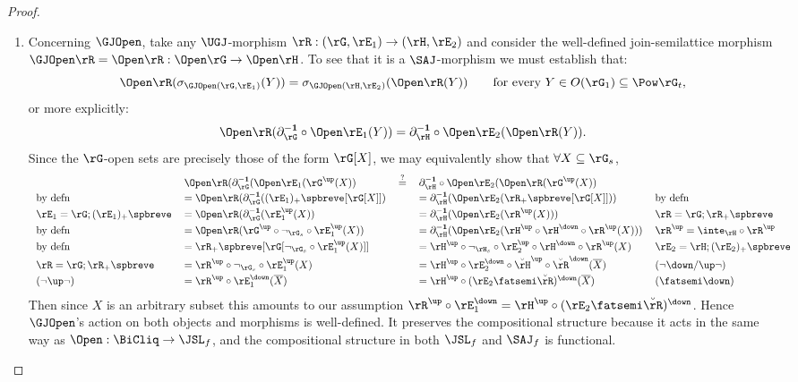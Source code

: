 \documentclass{article}
\begin{document}
\begin{proof}
\begin{enumerate}
\smallskip
\item
Concerning $\GJOpen$, take any $\UGJ$-morphism $\rR : (\rG,\rE_1) \to (\rH,\rE_2)$ and consider the well-defined join-semilattice morphism $\GJOpen\rR = \Open\rR : \Open\rG \to \Open\rH$. To see that it is a $\SAJ$-morphism we must establish that:
\[
\Open\rR(\sigma_{\GJOpen(\rG,\rE_1)}(Y))
= \sigma_{\GJOpen(\rH,\rE_2)}(\Open\rR(Y))
\qquad
\text{for every $Y \in O(\rG_1) \subseteq \Pow \rG_t$},
\]
or more explicitly:
\[
\Open\rR(\partial_\rG^{\bf-1} \circ \Open\rE_1(Y))
=
\partial_\rH^{\bf-1} \circ \Open\rE_2(\Open\rR(Y)).
\]
Since the $\rG$-open sets are precisely those of the form $\rG[X]$, we may equivalently show that $\forall X \subseteq \rG_s$,
\[
\begin{tabular}{llcll}
&
$\Open\rR(\partial_\rG^{\bf-1}(\Open\rE_1(\rG^\up(X))$
& $\stackrel{?}{=}$ &
$\partial_\rH^{\bf-1} \circ \Open\rE_2(\Open\rR(\rG^\up(X))$
&
\\[0.5ex]
by defn &
$=\Open\rR(\partial_\rG^{\bf-1}((\rE_1)_+\spbreve[\rG[X]])$
&&
$=\partial_\rH^{\bf-1}(\Open\rE_2( \rR_+\spbreve[\rG[X]] ))$
& by defn
\\[0.5ex]
$\rE_1 = \rG ; (\rE_1)_+\spbreve$ &
$=\Open\rR(\partial_\rG^{\bf-1}(\rE_1^\up(X))$
&&
$=\partial_\rH^{\bf-1}(\Open\rE_2(\rR^\up(X)))$
& $\rR = \rG ; \rR_+\spbreve$
\\[0.5ex]
by defn &
$=\Open\rR(\rG^\up \circ \neg_{\rG_s} \circ \rE_1^\up(X))$
&&
$=\partial_\rH^{\bf-1}(\Open\rE_2(\rH^\up \circ \rH^\down \circ \rR^\up(X)))$
& $\rR^\up = \inte_\rH \circ \rR^\up$
\\[0.5ex]
by defn &
$=\rR_+\spbreve[\rG[\neg_{\rG_s} \circ \rE_1^\up(X)]]$
&&
$= \rH^\up \circ \neg_{\rH_s} \circ \rE_2^\up \circ \rH^\down \circ \rR^\up(X) $
& $\rE_2 = \rH;(\rE_2)_+\spbreve$
\\[0.5ex]
$\rR = \rG ; \rR_+\spbreve$ &
$=\rR^\up \circ \neg_{\rG_s} \circ \rE_1^\up(X)$
&&
$=\rH^\up \circ \rE_2^\down \circ \breve{\rH}^\up \circ \breve{\rR}^\down(\overline{X})$
& $(\neg\down/\up\neg)$
\\[0.5ex]
$(\neg\up\neg)$ &
$=\rR^\up \circ \rE_1^\down (\overline{X})$
&&
$=\rH^\up \circ (\rE_2 \fatsemi \breve{\rR})^\down(\overline{X})$
& $(\fatsemi\down)$
\end{tabular}
\]
Then since $X$ is an arbitrary subset this amounts to our assumption $\rR^\up \circ \rE_1^\down = \rH^\up \circ (\rE_2 \fatsemi \breve{\rR})^\down$. Hence $\GJOpen$'s action on both objects and morphisms is well-defined. It preserves the compositional structure because it acts in the same way as $\Open : \BiCliq \to \JSL_f$, and the compositional structure in both $\JSL_f$ and $\SAJ_f$ is functional.



\end{enumerate}
\end{proof}
\end{document}
